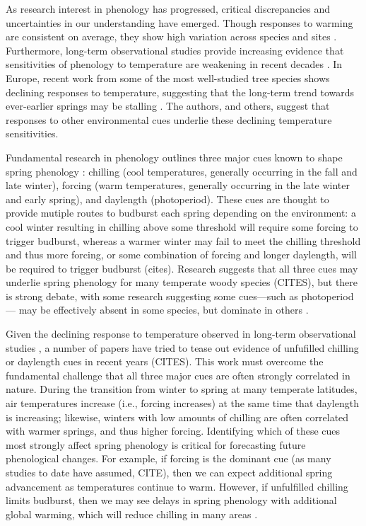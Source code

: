 \documentclass[11pt,letter]{article}
\begin{document}
\par As research interest in phenology has progressed, critical discrepancies and uncertainties in our understanding have emerged. Though responses to warming are consistent on average, they show high variation across species and sites \citep{Wolkovich:2012n}. Furthermore, long-term observational studies provide increasing evidence that sensitivities of phenology to temperature are weakening in recent decades \citep{yu2010}. In Europe, recent work from some of the most well-studied tree species shows declining responses to temperature, suggesting that the long-term trend towards ever-earlier springs may be stalling \citep{fu2015}. The authors, and others, suggest that responses to other environmental cues underlie these declining temperature sensitivities.

\par Fundamental research in phenology outlines three major cues known to shape spring phenology \citep{chuineJTB}: chilling (cool temperatures, generally occurring in the fall and late winter), forcing (warm temperatures, generally occurring in the late winter and early spring), and daylength (photoperiod). These cues are thought to provide mutiple routes to budburst each spring depending on the environment: a cool winter resulting in chilling above some threshold will require some forcing to trigger budburst, whereas a warmer winter may fail to meet the chilling threshold and thus more forcing, or some combination of forcing and longer daylength, will be required to trigger budburst (cites). Research suggests that all three cues may underlie spring phenology for many temperate woody species (CITES), but there is strong debate, with some research suggesting some cues---such as photoperiod--- may be effectively absent in some species, but dominate in others \citep{zohner2016,koerner2010a}. 

\par Given the declining response to temperature observed in long-term observational studies \citep{fu2015}, a number of papers have tried to tease out evidence of unfufilled chilling or daylength cues in recent years (CITES). This work must overcome the fundamental challenge that all three major cues are often strongly correlated in nature. During the transition from winter to spring at many temperate latitudes, air temperatures increase (i.e., forcing increases) at the same time that daylength is increasing; likewise, winters with low amounts of chilling are often correlated with warmer springs, and thus higher forcing.  Identifying which of these cues most strongly affect spring phenology is critical for forecasting future phenological changes. For example, if forcing is the dominant cue (as many studies to date have assumed, CITE), then we can expect additional spring advancement as temperatures continue to warm. However, if unfulfilled chilling limits budburst, then we may see delays in spring phenology with additional global warming, which will reduce chilling in many areas \citep{fraga2019}. %
\end{document}
